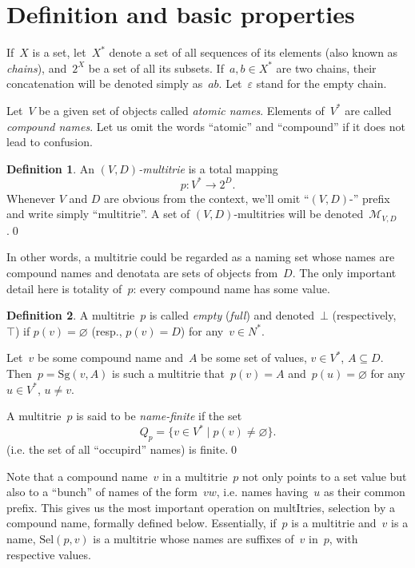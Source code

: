 \documentclass{article}
\theoremstyle{definition}
\newtheorem{Df}{Definition}
\newcommand{\mtempty}{\bot}
\newcommand{\mtfull}{\top}
\newcommand{\set}[1]{\mathcal{#1}}
\newcommand{\setmt}[2]{\set{M}_{#1,#2}}
\newcommand{\select}{\mathrm{Sel}}
\newcommand{\singleleaf}{\mathrm{Sg}}
\begin{document}
\section{Definition and basic properties}

If~$X$ is a set, let~$X^\ast$ denote a set of all sequences of its elements
(also known as \emph{chains}),
and~$2^X$ be a set of all its subsets. If~$a,b\in X^\ast$ are two chains,
their concatenation will be denoted simply as~$ab$. Let~$\varepsilon$ stand for
the empty chain.

Let~$V$ be a given set of objects called \emph{atomic names}. Elements
of~$V^\ast$ are called \emph{compound names}. Let us omit the words ``atomic''
and ``compound'' if it does not lead to confusion.

\begin{Df}
An \emph{$(V,D)$-multitrie} is a total mapping
\[
  p : V^\ast \to 2^D .
\]
Whenever $V$ and $D$ are obvious from the context, we'll omit ``$(V,D)$-''
prefix and write simply ``multitrie''. A set of $(V,D)$-multitries will be
denoted~$\setmt{V}{D}$.\qed
\end{Df}

In other words, a multitrie could be regarded as a naming set whose names are
compound names and denotata are sets of objects from~$D$. The only important
detail here is totality of~$p$: every compound name has some value.

\begin{Df}
A multitrie~$p$ is called \emph{empty} (\emph{full}) and denoted~$\mtempty$
(respectively,~$\mtfull$) if $p(v)=\varnothing$ (resp., $p(v)=D$) for any~$v\in
N^\ast$.

Let~$v$ be some compound name and~$A$ be some set of values, $v\in V^\ast$,
$A\subseteq D$.  Then~$p = \singleleaf(v,A)$ is such a multitrie that~$p(v) =
A$ and~$p(u) = \varnothing$ for any $u\in V^\ast$, $u\neq v$.

A multitrie~$p$ is said to be \emph{name-finite} if the set
\[
  Q_p = \{ v \in V^\ast \mid p(v) \neq \varnothing \} .
\]
(i.e. the set of all ``occupird'' names) is finite.\qed
\end{Df}

Note that a compound name~$v$ in a multitrie~$p$ not only points to a set
value but also to a ``bunch'' of names of the form~$vw$, i.e. names having~$u$
as their common prefix. This gives us
the most important operation on multItries, selection by a compound name,
formally defined below. Essentially, if~$p$ is a multitrie and~$v$ is a name,
$\select(p,v)$ is a multitrie whose names are suffixes of~$v$ in~$p$, with
respective values.
\end{document}
